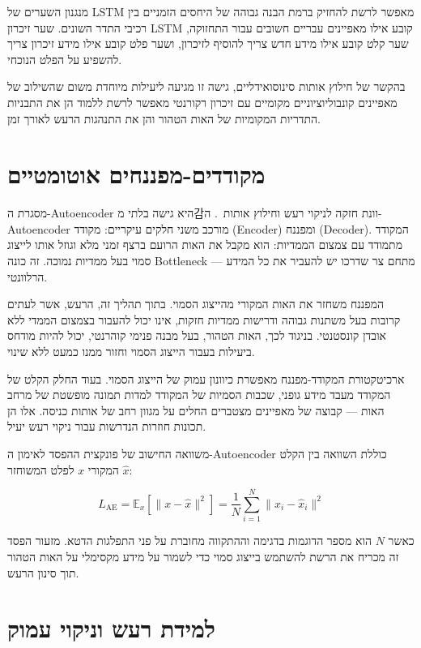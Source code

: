 מנגנון השערים של \textenglish{LSTM} מאפשר לרשת להחזיק ברמת הבנה גבוהה של היחסים הזמניים בין רכיבי התדר השונים. שער זיכרון \textenglish{LSTM} קובע אילו מאפיינים עבריים חשובים עבור התחזוקה, שער קלט קובע אילו מידע חדש צריך להוסיף לזיכרון, ושער פלט קובע אילו מידע זיכרון צריך להשפיע על הפלט הנוכחי.

בהקשר של חילוץ אותות סינוסואידליים, גישה זו מגיעה ליעילות מיוחדת משום שהשילוב של מאפיינים קונבוליוציוניים מקומיים עם זיכרון רקורנטי מאפשר לרשת ללמוד הן את התבניות התדריות המקומיות של האות הטהור והן את התנהגות הרעש לאורך זמן.

\section{מקודדים-מפננחים אוטומטיים}

מסגרת ה-\textenglish{Autoencoder} היא גישה בלתי מ감וונת חזקה לניקוי רעש וחילוץ אותות~\cite{xi2023rise}. ה-\textenglish{Autoencoder} מורכב משני חלקים עיקריים: מקודד (\textenglish{Encoder}) ומפננח (\textenglish{Decoder}). המקודד מתמודד עם צמצום הממדיות: הוא מקבל את האות הרועם ברצף זמני מלא וגוזל אותו לייצוג סמוי בעל ממדיות נמוכה. זה כונה \textenglish{Bottleneck} --- מתחם צר שדרכו יש להעביר את כל המידע הרלוונטי.

המפננח משחזר את האות המקורי מהייצוג הסמוי. בתוך תהליך זה, הרעש, אשר לעתים קרובות בעל משתנות גבוהה ודרישות ממדיות חזקות, אינו יכול להעבור בצמצום הממדי ללא אובדן קונסטנטי. בניגוד לכך, האות הטהור, בעל מבנה פנימי קוהרנטי, יכול להיות מודחס ביעילות בעבור הייצוג הסמוי וחזור ממנו כמעט ללא שינוי.

ארכיטקטורת המקודד-מפננח מאפשרת כיוונון עמוק של הייצוג הסמוי. בעוד החלק הקלט של המקודד מעבד מידע גופני, שכבות הסמיות של המקודד למדות תמונה מופשטת של מרחב האות --- קבוצה של מאפיינים מצטברים החלים על מגוון רחב של אותות כניסה. אלו הן תכונות חוזרות הנדרשות עבור ניקוי רעש יעיל.

משוואה החישוב של פונקצית ההפסד לאימון ה-\textenglish{Autoencoder} כוללת השוואה בין הקלט המקורי \(x\) לפלט המשוחזר \(\hat{x}\):

\begin{equation}
L_{\text{AE}} = \mathbb{E}_{x} \left[ \|x - \hat{x}\|^2 \right] = \frac{1}{N} \sum_{i=1}^{N} \|x_i - \hat{x}_i\|^2
\end{equation}

כאשר \(N\) הוא מספר הדוגמות בדגימה וההתקווה מחוברת על פני התפלגות הדטא. מזעור הפסד זה מכריח את הרשת להשתמש בייצוג סמוי כדי לשמור על מידע מקסימלי על האות הטהור תוך סינון הרעש.

\section{למידת רעש וניקוי עמוק}

